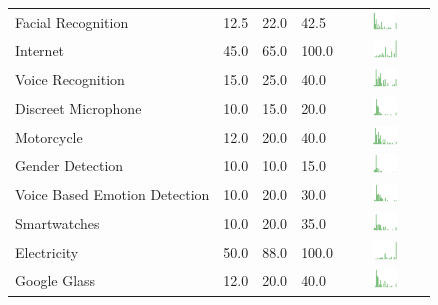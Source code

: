 \begin{table}[H!]
\begin{center}
\begin{tabular}{| p{2cm} | p{1cm} | p{1cm} | p{1cm} | c |}
Facial Recognition  & 12.5 & 22.0 & 42.5 & \includegraphics[width = 2cm, height = 0.5cm]{tables/facialrecognitionben} \\ 
Internet  & 45.0 & 65.0 & 100.0 & \includegraphics[width = 2cm, height = 0.5cm]{tables/internetben} \\ 
Voice Recognition  & 15.0 & 25.0 & 40.0 & \includegraphics[width = 2cm, height = 0.5cm]{tables/voicerecognitionben} \\ 
Discreet Microphone  & 10.0 & 15.0 & 20.0 & \includegraphics[width = 2cm, height = 0.5cm]{tables/discreetmicrophoneben} \\ 
Motorcycle & 12.0 & 20.0 & 40.0 & \includegraphics[width = 2cm, height = 0.5cm]{tables/MotorcycleBenefit} \\ 
Gender Detection  & 10.0 & 10.0 & 15.0 & \includegraphics[width = 2cm, height = 0.5cm]{tables/genderdetectionben} \\ 
Voice Based Emotion Detection  & 10.0 & 20.0 & 30.0 & \includegraphics[width = 2cm, height = 0.5cm]{tables/voicebasedemotiondetectionben} \\ 
Smartwatches  & 10.0 & 20.0 & 35.0 & \includegraphics[width = 2cm, height = 0.5cm]{tables/smartwatchesben} \\ 
Electricity & 50.0 & 88.0 & 100.0 & \includegraphics[width = 2cm, height = 0.5cm]{tables/ElectricityBenefit} \\ 
Google Glass  & 12.0 & 20.0 & 40.0 & \includegraphics[width = 2cm, height = 0.5cm]{tables/googleglassben} \\ 

\end{tabular}
\end{center}
\end{table}
